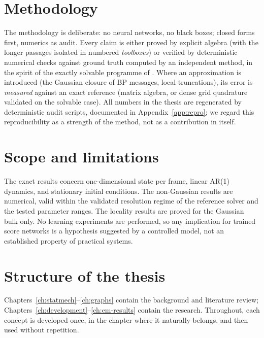 \section{Methodology}

The methodology is deliberate: no neural networks, no black boxes;
closed forms first, numerics as audit. Every claim is either proved by
explicit algebra (with the longer passages isolated in numbered
\emph{toolboxes}) or verified by deterministic numerical checks against
ground truth computed by an independent method, in the spirit of the
exactly solvable programme of \citet{biroli2023generative}. Where an
approximation is introduced (the Gaussian closure of BP messages, local
truncations), its error is \emph{measured} against an exact reference
(matrix algebra, or dense grid quadrature validated on the solvable
case). All numbers in the thesis are regenerated by deterministic audit
scripts, documented in Appendix~\ref{app:repro}; we regard this
reproducibility as a strength of the method, not as a contribution in
itself.

\section{Scope and limitations}

The exact results concern one-dimensional state per frame, linear AR(1)
dynamics, and stationary initial conditions. The non-Gaussian results
are numerical, valid within the validated resolution regime of the
reference solver and the tested parameter ranges. The locality results
are proved for the Gaussian bulk only. No learning experiments are
performed, so any implication for trained score networks is a hypothesis
suggested by a controlled model, not an established property of
practical systems.

\section{Structure of the thesis}

Chapters~\ref{ch:statmech}--\ref{ch:graphs} contain the background and
literature review; Chapters~\ref{ch:development}--\ref{ch:em-results}
contain the research. Throughout, each concept is developed once, in the
chapter where it naturally belongs, and then used without repetition.


